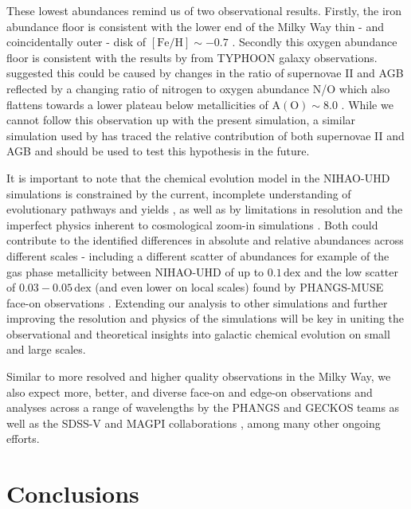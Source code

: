 \documentclass[twocolumn,apj,numberedappendix,appendixfloats,twocolappendix]{openjournal}
\begin{document}
\begin{CJK*}{UTF8}{gbsn}
These lowest abundances remind us of two observational results. Firstly, the iron abundance floor is consistent with the lower end of the Milky Way thin - and coincidentally outer - disk of ${\mathrm{[Fe/H]} \sim -0.7}$ \citep{Bensby2014, Buder2019}. Secondly this oxygen abundance floor is consistent with the results by \citet{Grasha2022} from TYPHOON galaxy observations. \citet{Grasha2022} suggested this could be caused by changes in the ratio of supernovae II and AGB reflected by a changing ratio of nitrogen to oxygen abundance N/O which also flattens towards a lower plateau below metallicities of ${\mathrm{A(O)} \sim 8.0}$ \citep{Nicholls2017}. While we cannot follow this observation up with the present simulation, a similar simulation used by \citet{Buder2024} has traced the relative contribution of both supernovae II and AGB and should be used to test this hypothesis in the future.

It is important to note that the chemical evolution model in the NIHAO-UHD simulations is constrained by the current, incomplete understanding of evolutionary pathways and yields \citep{Buck2021}, as well as by limitations in resolution and the imperfect physics inherent to cosmological zoom-in simulations \citep{Buck2020}.
Both could contribute to the identified differences in absolute and relative abundances across different scales - including a different scatter of abundances for example of the gas phase metallicity between NIHAO-UHD of up to $0.1\,\mathrm{dex}$ and the low scatter of $0.03-0.05\,\mathrm{dex}$ (and even lower on local scales) found by PHANGS-MUSE face-on observations \citep{Kreckel2020}. Extending our analysis to other simulations and further improving the resolution and physics of the simulations will be key in uniting the observational and theoretical insights into galactic chemical evolution on small and large scales.

Similar to more resolved and higher quality observations in the Milky Way, we also expect more, better, and diverse face-on and edge-on observations and analyses across a range of wavelengths by the PHANGS and GECKOS teams \citep{Kreckel2019, Kreckel2020, GECKOS2023} as well as the SDSS-V and MAGPI collaborations \citep{Kollmeier2017, MAGPI2021, Mun2024, Chen2024}, among many other ongoing efforts.

\section{Conclusions}
\label{sec:conc}


\end{CJK*}
\end{document}
